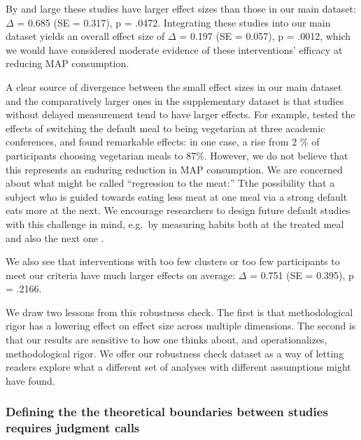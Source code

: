 \documentclass[sn-nature,referee,pdflatex]{sn-jnl}
\begin{document}
By and large these studies have larger effect sizes than those in our
main dataset: \(\Delta\) = 0.685 (SE = 0.317), p = .0472. Integrating
these studies into our main dataset yields an overall effect size of
\(\Delta\) = 0.197 (SE = 0.057), p = .0012, which we would have
considered moderate evidence of these interventions' efficacy at
reducing MAP consumption.

A clear source of divergence between the small effect sizes in our main
dataset and the comparatively larger ones in the supplementary dataset
is that studies without delayed measurement tend to have larger effects.
For example, \citep{hansen2021} tested the effects of switching the
default meal to being vegetarian at three academic conferences, and
found remarkable effects: in one case, a rise from 2 \% of participants
choosing vegetarian meals to 87\%. However, we do not believe that this
represents an enduring reduction in MAP consumption. We are concerned
about what might be called ``regression to the meat:'' Tthe possibility
that a subject who is guided towards eating less meat at one meal via a
strong default eats more at the next. We encourage researchers to design
future default studies with this challenge in mind, e.g.~by measuring
habits both at the treated meal and also the next one
\citep{vocski2024}.

We also see that interventions with too few clusters or too few
participants to meet our criteria have much larger effects on average:
\(\Delta\) = 0.751 (SE = 0.395), p = .2166.

We draw two lessons from this robustness check. The first is that
methodological rigor has a lowering effect on effect size across
multiple dimensions. The second is that our results are sensitive to how
one thinks about, and operationalizes, methodological rigor. We offer
our robustness check dataset as a way of letting readers explore what a
different set of analyses with different assumptions might have found.

\subsubsection{Defining the the theoretical boundaries between studies
requires judgment calls}\label{sec5.4.4}
\end{document}
